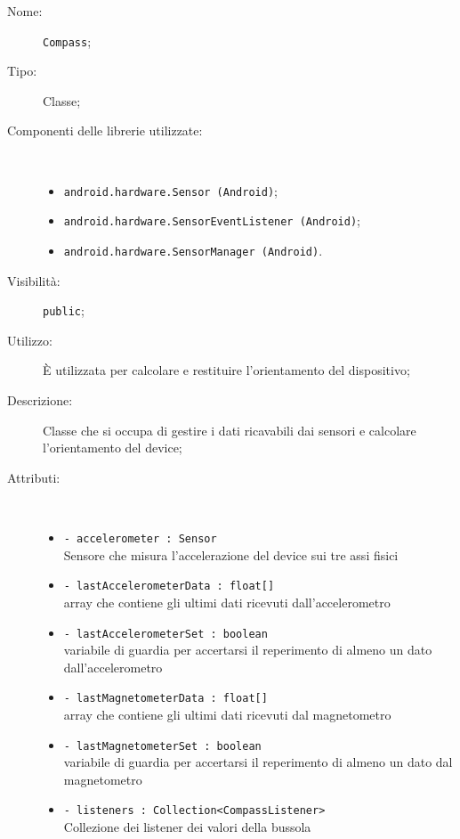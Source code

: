 \documentclass[../DefinizioneDiProdotto.tex]{subfiles}
\begin{document}
\begin{description}
	\item[Nome:] \texttt{Compass};
	\item[Tipo:] Classe;
	\item[Componenti delle librerie utilizzate:] \
	\begin{itemize}
		\item \texttt{android.hardware.Sensor (Android)};
		
		\item \texttt{android.hardware.SensorEventListener (Android)};
		
		\item \texttt{android.hardware.SensorManager (Android)}.
		
	\end{itemize}
	\item[Visibilità:] \texttt{public};
	\item[Utilizzo:] È utilizzata per calcolare e restituire l'orientamento del dispositivo;
	\item[Descrizione:] Classe che si occupa di gestire i dati ricavabili dai sensori e calcolare l'orientamento del device;
	\item[Attributi:] \
	\begin{itemize}
		\item \texttt{- accelerometer : Sensor}\\
		Sensore che misura l'accelerazione del device sui tre assi fisici
		
		\item \texttt{- lastAccelerometerData : float[]}\\
		array che contiene gli ultimi dati ricevuti dall'accelerometro
		
		\item \texttt{- lastAccelerometerSet : boolean}\\
		variabile di guardia per accertarsi il reperimento di almeno un dato dall'accelerometro
		
		\item \texttt{- lastMagnetometerData : float[]}\\
		array che contiene gli ultimi dati ricevuti dal magnetometro
		
		\item \texttt{- lastMagnetometerSet : boolean}\\
		variabile di guardia per accertarsi il reperimento di almeno un dato dal magnetometro
		
		\item \texttt{- listeners : Collection<CompassListener>}\\
		Collezione dei listener dei valori della bussola
		

\end{itemize}
\end{description}
\end{document}
